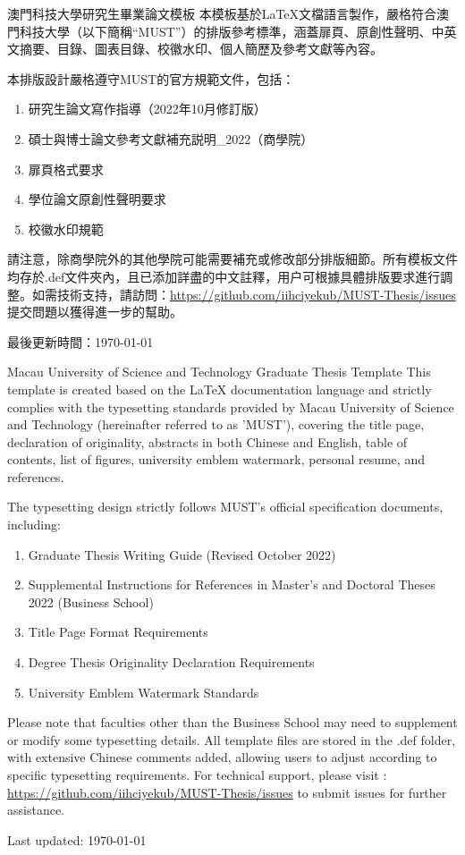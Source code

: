 \documentclass[
    writingLanguage=chinese, %
    addPageTitle=on,  %
    addDeclaration=on, %
    addMUSTlog=on, %
    addFigTOC=on, %
    addTabTOC=on, %
    refIndent=off, %
    printMod=off, %
]{must}
\begin{document}
\begin{abstract@cn}{澳門科技大學研究生畢業論文模板}
本模板基於\LaTeX{}文檔語言製作，嚴格符合澳門科技大學（以下簡稱“MUST”）的排版參考標準，涵蓋扉頁、原創性聲明、中英文摘要、目錄、圖表目錄、校徽水印、個人簡歷及參考文獻等內容。

\noindent 本排版設計嚴格遵守MUST的官方規範文件，包括：
\begin{enumerate}[label=\arabic*).]
\item 研究生論文寫作指導（2022年10月修訂版）
\item 碩士與博士論文參考文獻補充説明\_2022（商學院）
\item 扉頁格式要求
\item 學位論文原創性聲明要求
\item 校徽水印規範
\end{enumerate}
請注意，除商學院外的其他學院可能需要補充或修改部分排版細節。所有模板文件均存於.def文件夾內，且已添加詳盡的中文註釋，用户可根據具體排版要求進行調整。如需技術支持，請訪問\faGithub：\url{https://github.com/iihciyekub/MUST-Thesis/issues} 提交問題以獲得進一步的幫助。

\noindent 最後更新時間：\datea\today

\end{abstract@cn}

\begin{abstract@en}{Macau University of Science and Technology Graduate Thesis Template}
This template is created based on the \LaTeX{} documentation language and strictly complies with the typesetting standards provided by Macau University of Science and Technology (hereinafter referred to as 'MUST'), covering the title page, declaration of originality, abstracts in both Chinese and English, table of contents, list of figures, university emblem watermark, personal resume, and references.

\noindent The typesetting design strictly follows MUST's official specification documents, including:
\begin{enumerate}[label=\arabic*).]
\item Graduate Thesis Writing Guide (Revised October 2022)
\item Supplemental Instructions for References in Master's and Doctoral Theses 2022 (Business School)
\item Title Page Format Requirements
\item Degree Thesis Originality Declaration Requirements
\item University Emblem Watermark Standards
\end{enumerate}
Please note that faculties other than the Business School may need to supplement or modify some typesetting details. All template files are stored in the .def folder, with extensive Chinese comments added, allowing users to adjust according to specific typesetting requirements. For technical support, please visit \faGithub: \url{https://github.com/iihciyekub/MUST-Thesis/issues} to submit issues for further assistance.

\noindent Last updated: \dateb\today

\end{abstract@en}
\end{document}
